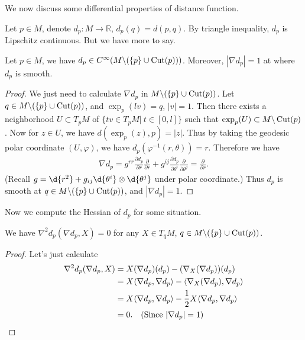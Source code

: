 We now discuss some differential properties of distance function.

Let $p\in M$, denote $d_p:M\to\mathbb{R}$, $d_p(q)=d(p,q)$.
By triangle inequality, $d_p$ is Lipschitz continuous.
But we have more to say.
\begin{prop}\label{dp smooth}
    Let $p\in M$, we have $d_p\in C^\infty(M\backslash(\{p\}\cup\operatorname{Cut}(p)))$.
    Moreover, $|\nabla d_p|=1$ at where $d_p$ is smooth.
\end{prop}
\begin{proof}
    We just need to calculate $\nabla d_p$ in $M\backslash(\{p\}\cup\operatorname{Cut}(p))$.
    Let $q\in M\backslash(\{p\}\cup\operatorname{Cut}(p))$, and $\exp_p(lv)=q$, $|v|=1$.
    Then there exists a neighborhood $U\subset T_pM$ of $\{tv\in T_pM|\ t\in[0,l]\}$ such that $\exp_p(U)\subset M\backslash\operatorname{Cut}(p)$.
    Now for $z\in U$, we have $d(\exp_p(z),p)=|z|$.
    Thus by taking the geodesic polar coordinate $(U,\varphi)$, we have $d_p(\varphi^{-1}(r,\theta))=r$.
    Therefore we have
    \begin{align*}
        \nabla d_p=g^{rr}\frac{\partial{d_p}}{\partial{r}}\frac{\partial{}}{\partial{r}}+g^{ij}\frac{\partial{d_p}}{\partial{\theta^i}}\frac{\partial{}}{\partial{\theta^j}}=\frac{\partial{}}{\partial{r}}.
    \end{align*}
    (Recall $g=\d{r^2}+g_{ij}\d{\theta^i}\otimes\d{\theta^j}$ under polar coordinate.)
    Thus $d_p$ is smooth at $q\in M\backslash(\{p\}\cup\operatorname{Cut}(p))$, and $|\nabla d_p|=1$.
\end{proof}

Now we compute the Hessian of $d_p$ for some situation.

\begin{prop}
    We have $\nabla^2d_p(\nabla d_p,X)=0$ for any $X\in T_qM$, $q\in M\backslash(\{p\}\cup\operatorname{Cut}(p))$.
\end{prop}
\begin{proof}
    Let's just calculate
    \begin{align*}
        \nabla^2d_p(\nabla d_p,X)&=X(\nabla d_p)(d_p)-(\nabla_X(\nabla d_p))(d_p)\\
        &=X\langle\nabla d_p,\nabla d_p\rangle-\langle\nabla_X(\nabla d_p),\nabla d_p\rangle\\
        &=X\langle\nabla d_p,\nabla d_p\rangle-\frac{1}{2}X\langle\nabla d_p,\nabla d_p\rangle\\
        &=0.\quad\text{(Since $|\nabla d_p|=1$)}\qedhere
    \end{align*}
\end{proof}

